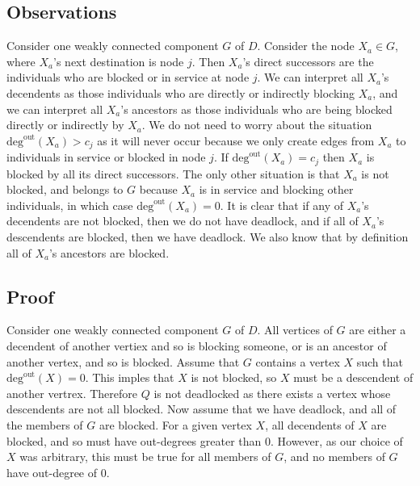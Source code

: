 \documentclass{article}
\begin{document}
\subsection*{Observations}
Consider one weakly connected component $G$ of $D$.
Consider the node $X_a \in G$, where $X_a$'s next destination is node $j$.
Then $X_a$'s direct successors are the individuals who are blocked or in service at node $j$.
We can interpret all $X_a$'s decendents as those individuals who are directly or indirectly blocking $X_a$, and we can interpret all $X_a$'s ancestors as those individuals who are being blocked directly or indirectly by $X_a$.\newline
We do not need to worry about the situation $\text{deg}^{\text{out}}(X_a) > c_j$ as it will never occur because we only create edges from $X_a$ to individuals in service or blocked in node $j$.
If $\text{deg}^{\text{out}}(X_a) = c_j$ then $X_a$ is blocked by all its direct successors.
The only other situation is that $X_a$ is not blocked, and belongs to $G$ because $X_a$ is in service and blocking other individuals, in which case $\text{deg}^{\text{out}}(X_a) = 0$.\newline
It is clear that if any of $X_a$'s decendents are not blocked, then we do not have deadlock, and if all of $X_a$'s descendents are blocked, then we have deadlock.
We also know that by definition all of $X_a$'s ancestors are blocked.\newline

\subsection*{Proof}
Consider one weakly connected component $G$ of $D$.
All vertices of $G$ are either a decendent of another vertiex and so is blocking someone, or is an ancestor of another vertex, and so is blocked.\newline
Assume that $G$ contains a vertex $X$ such that $\text{deg}^{\text{out}}(X) = 0$.
This imples that $X$ is not blocked, so $X$ must be a descendent of another vertrex.
Therefore $Q$ is not deadlocked as there exists a vertex whose descendents are not all blocked.\newline
Now assume that we have deadlock, and all of the members of $G$ are blocked.
For a given vertex $X$, all decendents of $X$ are blocked, and so must have out-degrees greater than 0.
However, as our choice of $X$ was arbitrary, this must be true for all members of $G$, and no members of $G$ have out-degree of 0.\newline



\end{document}
